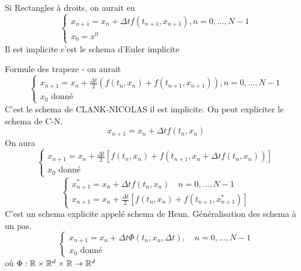 \begin{remark}
   Si Rectangles à droits, on aurait eu
   \begin{equation}
       \begin{cases}
            x_{n+1} = x_n + \Delta t f(t_{n+1}, x_{n+1}), n = 0, \ldots, N-1\\
            x_0 = x^0
       \end{cases}
   \end{equation}
   Il est implicite c'est le schema d'Euler implicite
\end{remark}
\begin{remark}
   Formule des trapeze - on aurait 
   \begin{equation}
       \begin{cases}
            x_{n+1} = x_n + \frac{\Delta t}{2}(f(t_n, x_n) + f(t_{n+1}, x_{n+1})), n = 0, \ldots, N-1\\
            x_0 \text{ donné}
       \end{cases}
   \end{equation}
    C'est le schema de CLANK-NICOLAS il est implicite. On peut expliciter le schema de C-N.
    \[
    x_{n+1} = x_n + \Delta t f(t_n, x_n)
    \] 
    On aura 
    \begin{equation}
        \begin{cases}
            x_{n+1} = x_n + \frac{\Delta t}{2}\left[ f(t_n, x_n) + f(t_{n+1}, x_n + \Delta t f(t_n, x_n)) \right] \\
            x_0 \text{ donné}
        \end{cases}
    \end{equation}
    \begin{equation}
        \begin{cases}
            x_{n+1}^{*} = x_n + \Delta t f(t_n, x_n) \quad n = 0, \ldots, N-1\\
            x_{n+1} = x_n + \frac{\Delta t}{2}\left[ f(t_n, x_n) + f(t_{n+1}, x_{n+1}^{*}) \right] 
        \end{cases}
    \end{equation}
    C'est un schema explicite appelé schema de Heun. Généralisation des schema à un pas.
    \begin{equation}
        \begin{cases}
            x_{n+1} = x_n + \Delta t \Phi(t_n, x_n, \Delta t), \quad n = 0, \ldots, N-1\\
            x_0 \text{ donné}
        \end{cases}
    \end{equation}
    où $\Phi: \mathbb{R} \times \mathbb{R}^d \times \mathbb{R} \to  \mathbb{R}^d$
\end{remark}

